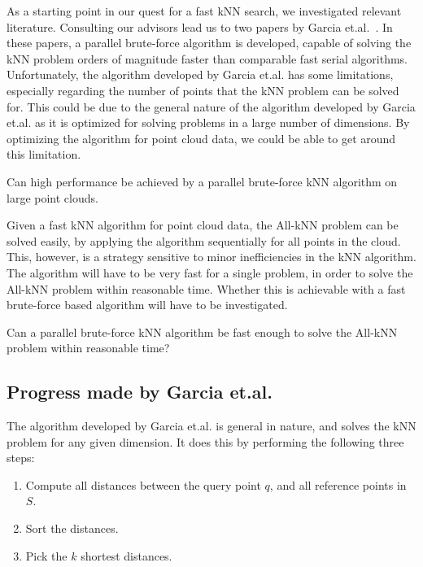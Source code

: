 As a starting point in our quest for a fast kNN search, we investigated relevant literature. Consulting our advisors lead us to two papers by Garcia et.al\@.~\citep{Garcia2008, Garcia2010}. In these papers, a parallel brute-force algorithm is developed, capable of solving the kNN problem orders of magnitude faster than comparable fast serial algorithms. Unfortunately, the algorithm developed by Garcia et.al. has some limitations, especially regarding the number of points that the kNN problem can be solved for. This could be due to the general nature of the algorithm developed by Garcia et.al\@. as it is optimized for solving problems in a large number of dimensions. By optimizing the algorithm for point cloud data, we could be able to get around this limitation.

\begin{myrq}
    Can high performance be achieved by a parallel brute-force kNN algorithm on large point clouds.
    \label{rq:brute_force_performance}
\end{myrq}

Given a fast kNN algorithm for point cloud data, the All-kNN problem can be solved easily, by applying the algorithm sequentially for all points in the cloud. This, however, is a strategy sensitive to minor inefficiencies in the kNN algorithm. The algorithm will have to be very fast for a single problem, in order to solve the All-kNN problem within reasonable time. Whether this is achievable with a fast brute-force based algorithm will have to be investigated.

\begin{myrq}
    Can a parallel brute-force kNN algorithm be fast enough to solve the All-kNN problem within reasonable time?
    \label{rq:brute_force_Q-kNN}
\end{myrq}

\subsection{Progress made by Garcia et.al.} %
\label{sub:garcia_s_effort}

The algorithm developed by Garcia et.al. is general in nature, and solves the kNN problem for any given dimension. It does this by performing the following three steps:

\begin{enumerate}
       \item Compute all distances between the query point $q$, and all reference points in $S$.
       \item Sort the distances.
       \item Pick the $k$ shortest distances.
\end{enumerate}

